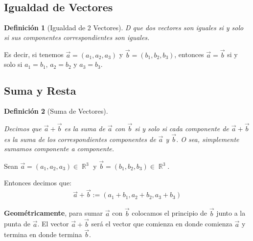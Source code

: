 \documentclass[12pt, fleqn]{report}                             %
\newtheorem{Definition}{Definición}[section]                    %
\theoremstyle{break}                                            %
\DeclareMathOperator \Reals        {\mathbb{R}}                 %
\begin{document}
            \subsection{Igualdad de Vectores}

                \begin{Definition}[Igualdad de 2 Vectores]
                    \label{DefIgualdadVectores}
                    D que dos vectores son iguales si y solo si sus componentes
                    correspondientes son iguales.
                \end{Definition}

                Es decir, si tenemos $\vec{a} = (a_1, a_2, a_3)$ y $\vec{b} = (b_1, b_2, b_3)$,
                entonces $\vec{a} = \vec{b}$ si y solo si $a_1 = b_1$, $a_2 = b_2$ y $a_3 = b_3$.

            
            \subsection{Suma y Resta}
            
                \begin{Definition}[Suma de Vectores]
                    \label{DefSumaVectores}

                    Decimos que $\vec{a}+\vec{b}$ es la suma de $\vec{a}$ con $\vec{b}$ si y solo si 
                    cada componente de $\vec{a}+\vec{b}$ es la suma de los correspondientes componentes
                    de $\vec{a}$ y $\vec{b}$.
                    O sea, simplemente sumamos componente a componente.

                \end{Definition}

                Sean $\vec{a} = (a_1, a_2, a_3) \in \Reals^3$ y $\vec{b}=(b_1, b_2, b_3) \in \Reals^3$.

                Entonces decimos que:
                \begin{align}
                    \vec{a} + \vec{b} := (a_1 + b_1, a_2 + b_2, a_3 + b_3)
                \end{align}
            
                \textbf{Geométricamente}, para sumar $\vec{a}$ con $\vec{b}$ colocamos el principio de
                $\vec{b}$ junto a la punta de $\vec{a}$. El vector $\vec{a} + \vec{b}$ será el vector
                que comienza en donde comienza $\vec{a}$ y termina en donde termina $\vec{b}$.
                
\end{document}
